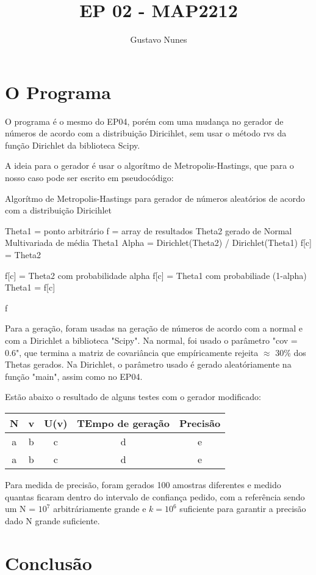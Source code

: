 \documentclass{article}
\date{}
\title{\vspace{-3.0cm}EP 02 - MAP2212}
\author{Gustavo Nunes }
\begin{document}
	
	\maketitle
	
	\section{O Programa}
	O programa é o mesmo do EP04, porém com uma mudança no gerador de números de acordo com a distribuição Diricihlet, sem usar o método rvs da função Dirichlet da biblioteca Scipy. 
	
	A ideia para o gerador é usar o algorítmo de Metropolis-Hastings, que para o nosso caso pode ser escrito em pseudocódigo: 
\begin{algorithm}
	\caption{Algorítmo de Metropolis-Hastings para gerador de números aleatórios de acordo com a distribuição Diricihlet}\label{}
	\begin{algorithmic}
		\State Theta1 = ponto arbitrário 
		\State f = array de resultados 
		\State Theta2 gerado de Normal Multivariada de média Theta1
		\State Alpha = Dirichlet(Theta2) / Dirichlet(Theta1)
			\State f[c] = Theta2 

			\State f[c] = Theta2 com probabilidade alpha
			\State f[c] = Theta1 com probabiliade (1-alpha)
		\EndIf
		\State Theta1 = f[c]

		\EndWhile
		\State
		\Return f
	\end{algorithmic}
\end{algorithm}
	
Para a geração, foram usadas na geração de números de acordo com a normal e com a Dirichlet a biblioteca "Scipy". Na normal, foi usado o parâmetro "cov = 0.6", que termina a matriz de covariância que empíricamente rejeita $\approx$ 30\% dos Thetas gerados. Na Dirichlet, o parâmetro usado é gerado aleatóriamente na função "main", assim como no EP04. 

Estão abaixo o resultado de alguns testes com o gerador modificado: 

	\begin{table}[htbp]
		\begin{tabular}{||c|c|c|c|c||}
			N & v & U(v) & TEmpo de geração & Precisão  \\
			\hline
			a & b & c & d & e \\	
			a & b & c & d & e \\
		\end{tabular}
	\end{table}

	Para medida de precisão, foram gerados 100 amostras diferentes e medido quantas ficaram dentro do intervalo de confiança pedido, com a referência sendo um N = $10^7$ arbitráriamente grande e $k = 10^6$ suficiente para garantir a precisão dado N grande suficiente. 
	
	\section{Conclusão}
\end{document}
